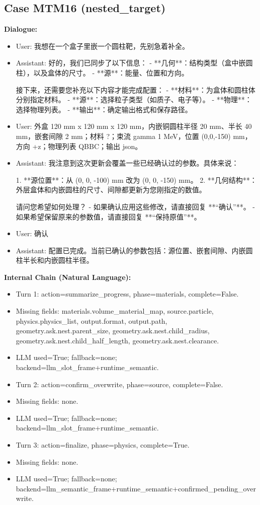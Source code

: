 \documentclass[11pt]{ctexart}
\begin{document}
\subsection{Case MTM16 (nested\_target)}
\textbf{Dialogue:}
\begin{itemize}
\item User: 我想在一个盒子里嵌一个圆柱靶，先别急着补全。
\item Assistant: 好的，我们已同步了以下信息：
- **几何**：结构类型（盒中嵌圆柱），以及盒体的尺寸。
- **源**：能量、位置和方向。

接下来，还需要您补充以下内容才能完成配置：
- **材料**：为盒体和圆柱体分别指定材料。
- **源**：选择粒子类型（如质子、电子等）。
- **物理**：选择物理列表。
- **输出**：确定输出格式和保存路径。
\item User: 外盒 120 mm x 120 mm x 120 mm，内嵌铜圆柱半径 20 mm、半长 40 mm，嵌套间隙 2 mm；材料 ?；束流 gamma 1 MeV，位置 (0,0,-150) mm，方向 +z；物理列表 QBBC；输出 json。
\item Assistant: 我注意到这次更新会覆盖一些已经确认过的参数。具体来说：

1.  **源位置**：从 (0, 0, -100) mm 改为 (0, 0, -150) mm。
2.  **几何结构**：外层盒体和内嵌圆柱的尺寸、间隙都更新为您刚指定的数值。

请问您希望如何处理？
- 如果确认应用这些修改，请直接回复 **“确认”**。
- 如果希望保留原来的参数值，请直接回复 **“保持原值”**。
\item User: 确认
\item Assistant: 配置已完成。当前已确认的参数包括：源位置、嵌套间隙、内嵌圆柱半长和内嵌圆柱半径。
\end{itemize}
\textbf{Internal Chain (Natural Language):}
\begin{itemize}
\item Turn 1: action=summarize\_progress, phase=materials, complete=False.
\item Missing fields: materials.volume\_material\_map, source.particle, physics.physics\_list, output.format, output.path, geometry.ask.nest.parent\_size, geometry.ask.nest.child\_radius, geometry.ask.nest.child\_half\_length, geometry.ask.nest.clearance.
\item LLM used=True; fallback=none; backend=llm\_slot\_frame+runtime\_semantic.
\item Turn 2: action=confirm\_overwrite, phase=source, complete=False.
\item Missing fields: none.
\item LLM used=True; fallback=none; backend=llm\_slot\_frame+runtime\_semantic.
\item Turn 3: action=finalize, phase=physics, complete=True.
\item Missing fields: none.
\item LLM used=True; fallback=none; backend=llm\_semantic\_frame+runtime\_semantic+confirmed\_pending\_overwrite.
\end{itemize}
\end{document}
